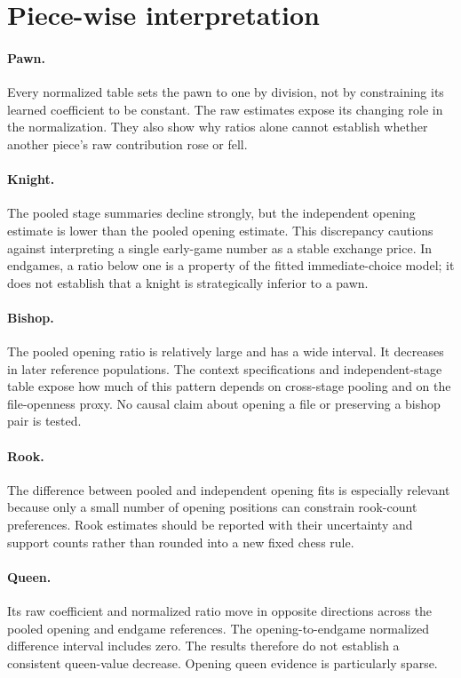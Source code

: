 \documentclass[11pt]{article}
\begin{document}
\FloatBarrier
\section{Piece-wise interpretation}
\paragraph{Pawn.} Every normalized table sets the pawn to one by division, not by constraining its learned coefficient to be constant. The raw estimates expose its changing role in the normalization. They also show why ratios alone cannot establish whether another piece's raw contribution rose or fell.
\paragraph{Knight.} The pooled stage summaries decline strongly, but the independent opening estimate is lower than the pooled opening estimate. This discrepancy cautions against interpreting a single early-game number as a stable exchange price. In endgames, a ratio below one is a property of the fitted immediate-choice model; it does not establish that a knight is strategically inferior to a pawn.
\paragraph{Bishop.} The pooled opening ratio is relatively large and has a wide interval. It decreases in later reference populations. The context specifications and independent-stage table expose how much of this pattern depends on cross-stage pooling and on the file-openness proxy. No causal claim about opening a file or preserving a bishop pair is tested.
\paragraph{Rook.} The difference between pooled and independent opening fits is especially relevant because only a small number of opening positions can constrain rook-count preferences. Rook estimates should be reported with their uncertainty and support counts rather than rounded into a new fixed chess rule.
\paragraph{Queen.} Its raw coefficient and normalized ratio move in opposite directions across the pooled opening and endgame references. The opening-to-endgame normalized difference interval includes zero. The results therefore do not establish a consistent queen-value decrease. Opening queen evidence is particularly sparse.
\end{document}
